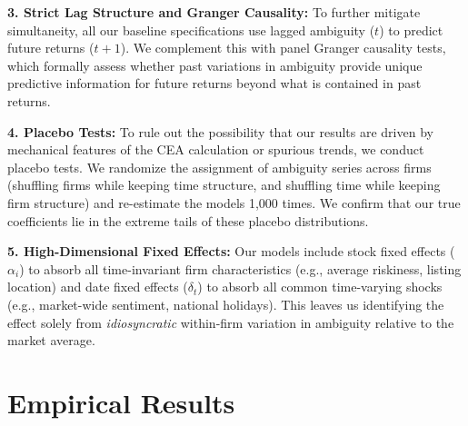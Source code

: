 \documentclass[preprint,12pt,authoryear]{elsarticle}
\begin{document}
\textbf{3. Strict Lag Structure and Granger Causality:} To further mitigate simultaneity, all our baseline specifications use lagged ambiguity ($t$) to predict future returns ($t+1$). We complement this with panel Granger causality tests, which formally assess whether past variations in ambiguity provide unique predictive information for future returns beyond what is contained in past returns.

\textbf{4. Placebo Tests:} To rule out the possibility that our results are driven by mechanical features of the CEA calculation or spurious trends, we conduct placebo tests. We randomize the assignment of ambiguity series across firms (shuffling firms while keeping time structure, and shuffling time while keeping firm structure) and re-estimate the models 1,000 times. We confirm that our true coefficients lie in the extreme tails of these placebo distributions.

\textbf{5. High-Dimensional Fixed Effects:} Our models include stock fixed effects ($\alpha_i$) to absorb all time-invariant firm characteristics (e.g., average riskiness, listing location) and date fixed effects ($\delta_t$) to absorb all common time-varying shocks (e.g., market-wide sentiment, national holidays). This leaves us identifying the effect solely from \textit{idiosyncratic} within-firm variation in ambiguity relative to the market average.

\section{Empirical Results}
\end{document}
